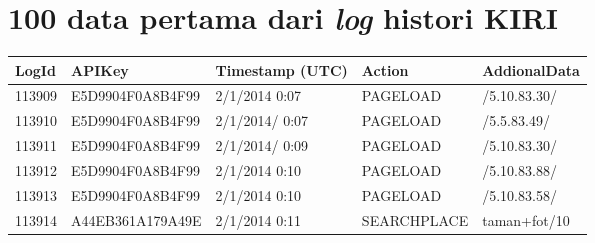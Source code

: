 \chapter{100 data pertama dari \textsl{log} histori KIRI}

\begin{longtable}{|p{1cm}|l|l|l|p{8cm}|}
\hline
\textbf{LogId} & \textbf{APIKey}  & \textbf{Timestamp (UTC)} & \textbf{Action} & \textbf{AddionalData}                                                                                                                                                                                                 \\ \hline
113909         & E5D9904F0A8B4F99 & 2/1/2014 0:07            & PAGELOAD        & /5.10.83.30/                                                                                                                                                                                                          \\ \hline
113910         & E5D9904F0A8B4F99 & 2/1/2014/ 0:07           & PAGELOAD        & /5.5.83.49/                                                                                                                                                                                                           \\ \hline
113911         & E5D9904F0A8B4F99 & 2/1/2014/ 0:09           & PAGELOAD        & /5.10.83.30/                                                                                                                                                                                                          \\ \hline
113912         & E5D9904F0A8B4F99 & 2/1/2014 0:10            & PAGELOAD        & /5.10.83.88/                                                                                                                                                                                                          \\ \hline
113913         & E5D9904F0A8B4F99 & 2/1/2014 0:10            & PAGELOAD        & /5.10.83.58/                                                                                                                                                                                                          \\ \hline
113914         & A44EB361A179A49E & 2/1/2014 0:11            & SEARCHPLACE     & taman+fot/10                                                                                                                                                                                                          \\ \hline

\end{longtable}
